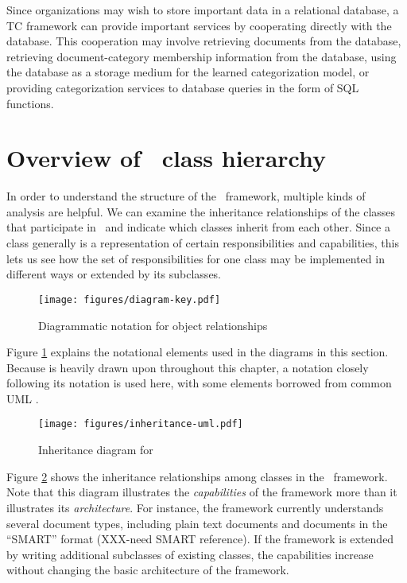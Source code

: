 Since organizations may wish to store important data in a relational
database, a TC framework can provide important services by cooperating
directly with the database.  This cooperation may involve retrieving
documents from the database, retrieving document-category membership
information from the database, using the database as a storage medium
for the learned categorization model, or providing categorization
services to database queries in the form of SQL functions.

\section{Overview of \aicat\ class hierarchy}
\label{class-overview}

In order to understand the structure of the \aicat\ framework,
multiple kinds of analysis are helpful.  We can examine the
inheritance relationships of the classes that participate in
\aicat\, and indicate which classes inherit from each other.
Since a class generally is a representation of certain
responsibilities and capabilities, this lets us see how the set of
responsibilities for one class may be implemented in different ways or
extended by its subclasses.

\begin{figure}
\begin{center}
\texttt{[image: figures/diagram-key.pdf]}
\caption{Diagrammatic notation for object relationships}
\label{diagram-key}
\end{center}
\end{figure}

Figure \ref{diagram-key} explains the notational elements used in the
diagrams in this section.  Because \cite{gamma:95} is heavily drawn
upon throughout this chapter, a notation closely following its
notation is used here, with some elements borrowed from common UML
\cite[ch. 4-5]{booch:98}.

\begin{figure}
\texttt{[image: figures/inheritance-uml.pdf]}
\caption{Inheritance diagram for \aicat}
\label{inheritance-uml}
\end{figure}

Figure \ref{inheritance-uml} shows the inheritance relationships among
classes in the \aicat\ framework.  Note that this diagram
illustrates the \emph{capabilities} of the framework more than it
illustrates its \emph{architecture}.  For instance, the framework
currently understands several document types, including plain text
documents and documents in the ``SMART'' format (XXX-need SMART reference).  If the framework is
extended by writing additional subclasses of existing classes, the
capabilities increase without changing the basic architecture of the
framework.

